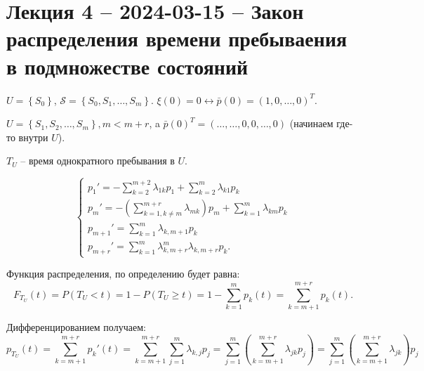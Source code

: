 \section{Лекция 4 -- 2024-03-15 -- Закон распределения времени пребываения в
подмножестве состояний}

\begin{ex}
  $U = \left\{ S_0 \right\} $,
  $\mathcal{S} = \left\{ S_0, S_1, \dots, S_m \right\} $.
  $\xi(0) = 0 \leftrightarrow \bar{p}(0) = (1, 0, \dots, 0)^T$.
\end{ex}


\begin{ex}
  $U = \left\{ S_1, S_2, \dots, S_{m} \right\}, m < m+r $, 
  a $\bar{p}(0)^T = ( \dots, \dots, 0, 0, \dots, 0)$ (начинаем где-то внутри $U$).
  

  $T_U$ -- время однократного пребывания в $U$.

  \[
    \begin{cases}
      p_1' = - \sum_{k=2}^{m+2} \lambda_{1k} p_1 + \sum_{k=2}^m \lambda_{k 1} p_k  \\
      p_m' = - \left( \sum_{k=1, k\neq m}^{m+r} \lambda_{mk} \right) p_m + \sum_{k=1}^m \lambda_{km} p_k \\
      p_{m+1}' = \sum_{k=1}^m \lambda_{k, m+1} p_k \\
      p_{m+r}' = \sum_{k=1}^m \lambda_{k, m+r}^{m} \lambda_{k, m+r} p_k.
    \end{cases}
  \]

  Функция распределения, по определению будет равна:
  \[
    F_{T_U}(t) = P(T_U < t) = 1 - P(T_U \geqslant t)
    = 1 - \sum_{k=1}^m p_k(t)
    = \sum_{k=m+1}^{m+r} p_k(t).
  \]

  Дифференцированием получаем:
  \[
    p_{T_U}(t) = \sum_{k=m+1}^{m+r} p_k'(t)
    = \sum_{k=m+1}^{m+r} \sum_{j=1}^m \lambda_{k, j} p_j
    = \sum_{j=1}^m \left( \sum_{k=m+1}^{m+r} \lambda_{jk} p_j \right)
    = \sum_{j=1}^m \left( \sum_{k=m+1}^{m+r} \lambda_{jk} \right) p_j
  \]
\end{ex}

